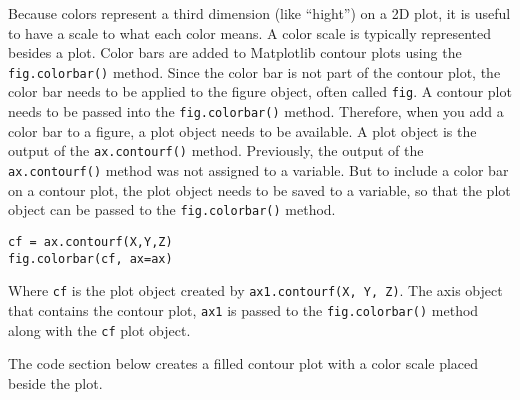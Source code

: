 \documentclass{book}
\newcommand{\passthrough}[1]{#1}
\begin{document}
    
        Because colors represent a third dimension (like ``hight'') on a 2D
plot, it is useful to have a scale to what each color means. A color
scale is typically represented besides a plot. Color bars are added to
Matplotlib contour plots using the
\passthrough{\lstinline!fig.colorbar()!} method. Since the color bar is
not part of the contour plot, the color bar needs to be applied to the
figure object, often called \passthrough{\lstinline!fig!}. A contour
plot needs to be passed into the
\passthrough{\lstinline!fig.colorbar()!} method. Therefore, when you add
a color bar to a figure, a plot object needs to be available. A plot
object is the output of the \passthrough{\lstinline!ax.contourf()!}
method. Previously, the output of the
\passthrough{\lstinline!ax.contourf()!} method was not assigned to a
variable. But to include a color bar on a contour plot, the plot object
needs to be saved to a variable, so that the plot object can be passed
to the \passthrough{\lstinline!fig.colorbar()!} method.

\begin{lstlisting}
cf = ax.contourf(X,Y,Z)
fig.colorbar(cf, ax=ax)
\end{lstlisting}

Where \passthrough{\lstinline!cf!} is the plot object created by
\passthrough{\lstinline!ax1.contourf(X, Y, Z)!}. The axis object that
contains the contour plot, \passthrough{\lstinline!ax1!} is passed to
the \passthrough{\lstinline!fig.colorbar()!} method along with the
\passthrough{\lstinline!cf!} plot object.

The code section below creates a filled contour plot with a color scale
placed beside the plot.
    
\end{document}
